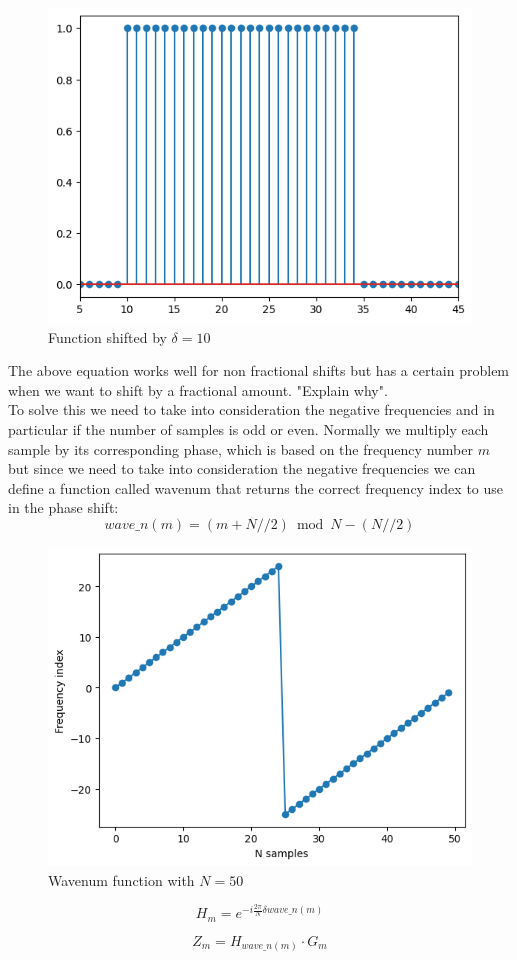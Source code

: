 \documentclass[]{usiinfbachelorproject}
\begin{document}
	\begin{figure}[h]
		\centering
		\includegraphics[width=0.5\columnwidth]{images/box_shifted_delta10_n50.png}
		\caption{Function shifted by $\delta=10$}
	\end{figure}
	
	
	The above equation works well for non fractional shifts but has a certain problem when we want to shift by a fractional amount.
	"Explain why".\\
	To solve this we need to take into consideration the negative frequencies and in particular if the number of samples is odd or even.
	Normally we multiply each sample by its corresponding phase, which is based on the frequency number $m$
	but since we need to take into consideration the negative frequencies we can define a function called wavenum that returns the correct frequency index to use in the phase shift:
	\begin{equation*}
		wave\_n(m) = (m + N // 2) \bmod N - (N//2)
	\end{equation*}
	
	\begin{figure}[h]
		\centering
		\includegraphics[width=0.5\columnwidth]{images/wavenum_n50.png}
		\caption{Wavenum function with $N=50$}
	\end{figure}
	
	\begin{equation*}
		H_m = e^{-i \frac{2\pi}{N}  \delta wave\_n(m)}
	\end{equation*}
	
	\begin{equation}
		Z_m = H_{wave\_n(m)} \cdot G_m
	\end{equation}	
	
\end{document}
